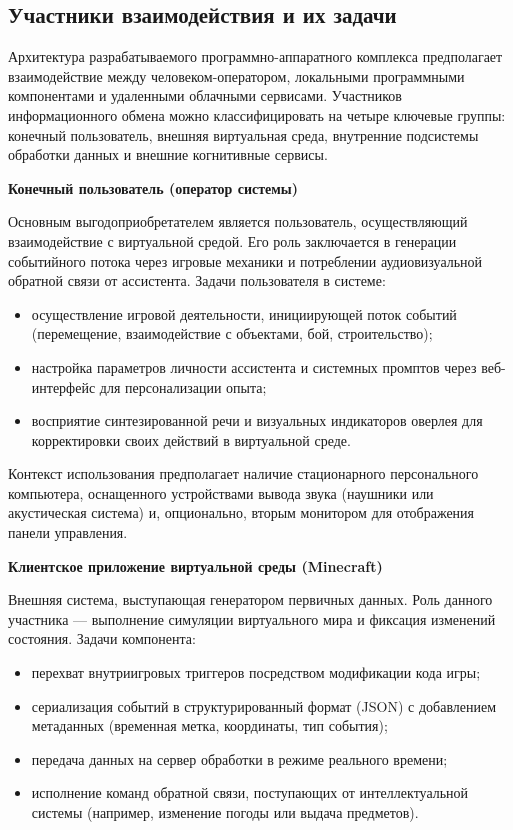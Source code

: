 \subsection{Участники взаимодействия и их задачи}



Архитектура разрабатываемого программно-аппаратного комплекса предполагает взаимодействие между человеком-оператором, локальными программными компонентами и удаленными облачными сервисами. Участников информационного обмена можно классифицировать на четыре ключевые группы: конечный пользователь, внешняя виртуальная среда, внутренние подсистемы обработки данных и внешние когнитивные сервисы.

\textbf{Конечный пользователь (оператор системы)}

Основным выгодоприобретателем является пользователь, осуществляющий взаимодействие с виртуальной средой. Его роль заключается в генерации событийного потока через игровые механики и потреблении аудиовизуальной обратной связи от ассистента. Задачи пользователя в системе:
\begin{itemize}
    \item осуществление игровой деятельности, инициирующей поток событий (перемещение, взаимодействие с объектами, бой, строительство);
    \item настройка параметров личности ассистента и системных промптов через веб-интерфейс для персонализации опыта;
    \item восприятие синтезированной речи и визуальных индикаторов оверлея для корректировки своих действий в виртуальной среде.
\end{itemize}
Контекст использования предполагает наличие стационарного персонального компьютера, оснащенного устройствами вывода звука (наушники или акустическая система) и, опционально, вторым монитором для отображения панели управления.

\textbf{Клиентское приложение виртуальной среды (Minecraft)}

Внешняя система, выступающая генератором первичных данных. Роль данного участника — выполнение симуляции виртуального мира и фиксация изменений состояния. Задачи компонента:
\begin{itemize}
    \item перехват внутриигровых триггеров посредством модификации кода игры;
    \item сериализация событий в структурированный формат (JSON) с добавлением метаданных (временная метка, координаты, тип события);
    \item передача данных на сервер обработки в режиме реального времени;
    \item исполнение команд обратной связи, поступающих от интеллектуальной системы (например, изменение погоды или выдача предметов).
\end{itemize}


